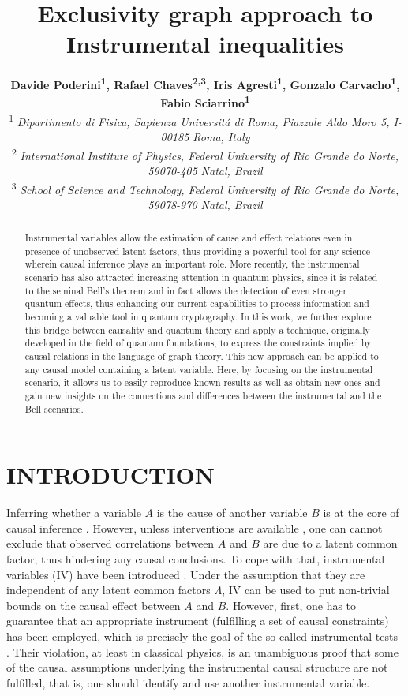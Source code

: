 \documentclass[letterpaper]{article}
\title{Exclusivity graph approach to Instrumental inequalities}
\author{
{\bf Davide Poderini\textsuperscript{1}, 
     Rafael Chaves\textsuperscript{2,3}, 
     Iris Agresti\textsuperscript{1}, 
     Gonzalo Carvacho\textsuperscript{1}, 
     Fabio Sciarrino\textsuperscript{1}}\\
\textsuperscript{1}{\it
Dipartimento di Fisica,
Sapienza Universit\'a di Roma, 
Piazzale Aldo Moro 5, I-00185 Roma, Italy}\\
\textsuperscript{2}{\it
International Institute of Physics, 
Federal University of Rio Grande do Norte, 
59070-405 Natal, Brazil}\\
\textsuperscript{3}{\it
School of Science and Technology, 
Federal University of Rio Grande do Norte, 
59078-970 Natal, Brazil}\\
}
\begin{document}
\maketitle

\begin{abstract}
Instrumental variables allow the estimation of cause and effect relations even
in presence of unobserved latent factors, thus providing a powerful tool for any
science wherein causal inference plays an important role. More recently, the
instrumental scenario has also attracted increasing attention in quantum
physics, since it is related to the seminal Bell's theorem and in fact allows
the detection of even stronger quantum effects, thus enhancing our current
capabilities to process information and becoming a valuable tool in quantum
cryptography. In this work, we further explore this bridge between causality and
quantum theory and apply a technique, originally developed in the field of
quantum foundations, to express the constraints implied by causal relations in
the language of graph theory. This new approach can be applied to any causal
model containing a latent variable. Here, by focusing on the instrumental
scenario, it allows us to easily reproduce known results as well as obtain new
ones and gain new insights on the connections and differences between the
instrumental and the Bell scenarios. 
\end{abstract}

\section{INTRODUCTION}
Inferring  whether a variable $A$ is the cause of another variable
$B$ is at the core of causal inference \cite{Mooij}. However, unless
interventions are available \cite{pearlbook}, one can cannot exclude that
observed correlations between $A$ and $B$ are due to a latent common
factor, thus hindering any causal conclusions. To cope with that,
instrumental variables (IV) have been introduced \cite{pearl1995,
bonet2001}. Under the assumption that they are independent of any
latent common factors $\Lambda$, IV can be used to put non-trivial
bounds on the causal effect between $A$ and $B$. However, first,
one has to guarantee that an appropriate instrument (fulfilling a
set of causal constraints) has been employed, which is precisely
the goal of the so-called instrumental tests \cite{pearl1995,
bonet2001,Ramsahai2012,Kedagni2017}. Their violation, at least in
classical physics, is an unambiguous proof that some of the causal
assumptions underlying the instrumental causal structure are not
fulfilled, that is, one should identify and use another instrumental
variable.
\end{document}
